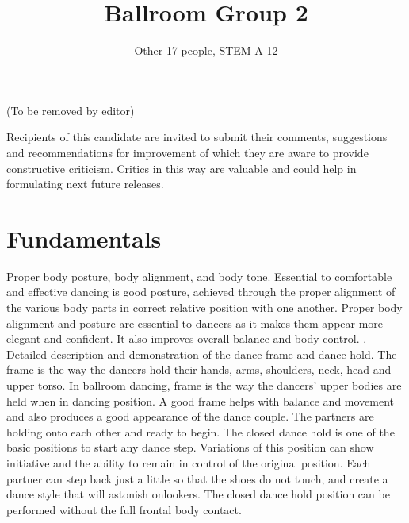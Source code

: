 \documentclass{article}
\title{Ballroom Group 2}
\author{Other 17 people, STEM-A 12}
\begin{document}
\maketitle

\abstract
\centerline{(To be removed by editor)}
Recipients of this candidate are invited to submit their comments, suggestions and recommendations
for improvement of which they are aware to provide constructive criticism. Critics in this way
are valuable and could help in formulating next future releases.

\tableofcontents
\clearpage

\section{Fundamentals}
 Proper body posture, body alignment, and body tone. 
 Essential to comfortable and effective dancing is good posture, achieved through the proper alignment of the various body parts in correct relative position with one another. Proper body alignment and posture are essential to dancers as it makes them appear more elegant and confident. It also improves overall balance and body control.
 . Detailed description and demonstration of the dance frame and dance hold.
 The frame is the way the dancers hold their hands, arms, shoulders, neck, head and upper torso. In ballroom dancing, frame is the way the dancers’ upper bodies are held when in dancing position. A good frame helps with balance and movement and also produces a good appearance of the dance couple.
 The partners are holding onto each other and ready to begin. The closed dance hold is one of the basic positions to start any dance step. Variations of this position can show initiative and the ability to remain in control of the original position. Each partner can step back just a little so that the shoes do not touch, and create a dance style that will astonish onlookers. The closed dance hold position can be performed without the full frontal body contact. 
\end{document}

